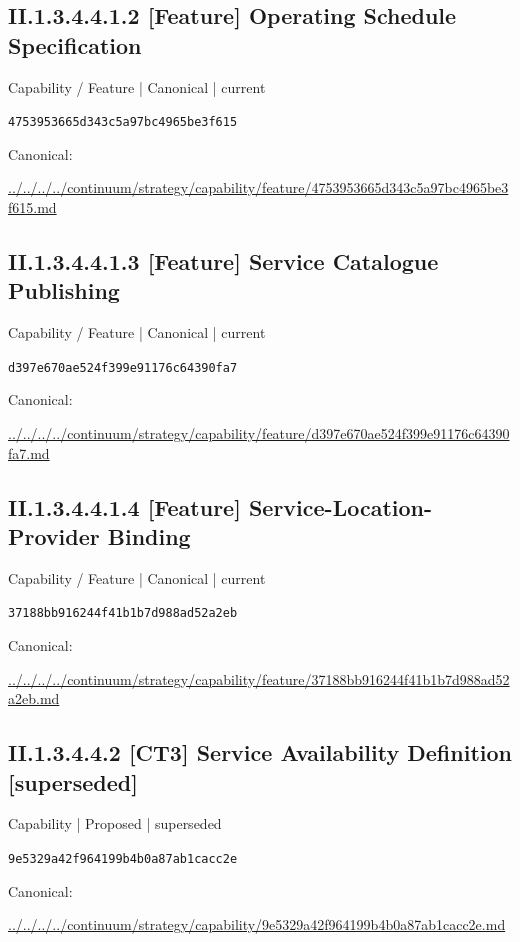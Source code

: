 \documentclass[10pt,a4paper]{article}
\begin{document}
\subsection*{II.1.3.4.4.1.2 [Feature] Operating Schedule Specification}
\label{element-4753953665d343c5a97bc4965be3f615}
{\small Capability / Feature | Canonical | current}\par
\texttt{4753953665d343c5a97bc4965be3f615}\par
Canonical: \par
{\footnotesize\url{../../../../continuum/strategy/capability/feature/4753953665d343c5a97bc4965be3f615.md}}\par
\subsection*{II.1.3.4.4.1.3 [Feature] Service Catalogue Publishing}
\label{element-d397e670ae524f399e91176c64390fa7}
{\small Capability / Feature | Canonical | current}\par
\texttt{d397e670ae524f399e91176c64390fa7}\par
Canonical: \par
{\footnotesize\url{../../../../continuum/strategy/capability/feature/d397e670ae524f399e91176c64390fa7.md}}\par
\subsection*{II.1.3.4.4.1.4 [Feature] Service-Location-Provider Binding}
\label{element-37188bb916244f41b1b7d988ad52a2eb}
{\small Capability / Feature | Canonical | current}\par
\texttt{37188bb916244f41b1b7d988ad52a2eb}\par
Canonical: \par
{\footnotesize\url{../../../../continuum/strategy/capability/feature/37188bb916244f41b1b7d988ad52a2eb.md}}\par
\subsection*{II.1.3.4.4.2 [CT3] Service Availability Definition [superseded]}
\label{element-9e5329a42f964199b4b0a87ab1cacc2e}
{\small Capability | Proposed | superseded}\par
\texttt{9e5329a42f964199b4b0a87ab1cacc2e}\par
Canonical: \par
{\footnotesize\url{../../../../continuum/strategy/capability/9e5329a42f964199b4b0a87ab1cacc2e.md}}\par
\end{document}
